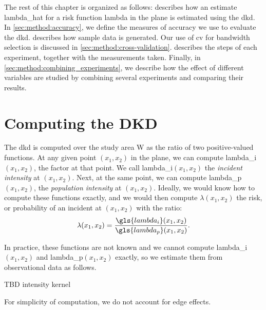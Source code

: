 The rest of this chapter is organized as follows:
 describes how an estimate \gls{lambda_hat} for a risk function \gls{lambda} in the plane is estimated using the \gls{dkd}.
In \cref{sec:method:accuracy}, we define the measures of accuracy we use to evaluate the \gls{dkd}.
 describes how sample data is generated.
Our use of \gls{cv} for bandwidth selection is discussed in  \cref{sec:method:cross-validation}.
 describes the steps of each experiment, together with the measurements taken.
Finally, in \cref{sec:method:combining_experiments}, we describe how the effect of different variables are studied by combining several experiments and comparing their results.

\section{Computing the DKD}
\label{sec:method:computing}

The \gls{dkd} is computed over the study area \gls{W} as the ratio of two positive-valued functions.
At any given point \((x_1, x_2)\) in the plane, we can compute \gls{lambda_i}\((x_1, x_2)\), the \gls{factor} at that point.
We call \gls{lambda_i}\((x_1, x_2)\) the \textit{incident intensity} at \((x_1, x_2)\).
Next, at the same point, we can compute \gls{lambda_p}\((x_1, x_2)\), the \textit{population intensity} at \((x_1, x_2)\).
Ideally, we would know how to compute these functions exactly, and we would then compute \(\lambda(x_1, x_2)\) the risk,
or probability of an incident at \((x_1, x_2)\) with the ratio:
\begin{equation}
    \lambda(x_1, x_2) = \frac{\gls{lambda_i}(x_1, x_2)}{\gls{lambda_p}(x_1, x_2)}.
\end{equation}

In practice, these functions are not known and we cannot compute \gls{lambda_i}\((x_1, x_2)\) and \gls{lambda_p}\((x_1, x_2)\) exactly, 
so we estimate them from observational data as follows.

TBD intensity kernel

For simplicity of computation, we do not account for edge effects.


